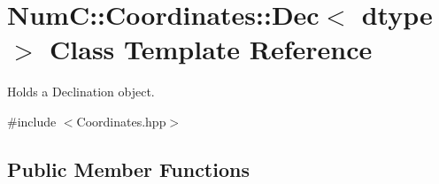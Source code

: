 \hypertarget{class_num_c_1_1_coordinates_1_1_dec}{}\section{NumC\+:\+:Coordinates\+:\+:Dec$<$ dtype $>$ Class Template Reference}
\label{class_num_c_1_1_coordinates_1_1_dec}


Holds a Declination object.  




{\ttfamily \#include $<$Coordinates.\+hpp$>$}

\subsection*{Public Member Functions}
